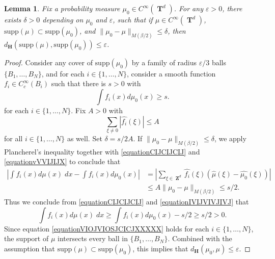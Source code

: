 \documentclass[12pt,reqno]{article}
\numberwithin{equation}{section}
\DeclareMathOperator{\ZZ}{\mathbf{Z}}
\DeclareMathOperator{\TT}{\mathbf{T}}
\newtheorem{lemma}[theorem]{Lemma}
\numberwithin{theorem}{section}
\begin{document}
\begin{lemma} \label{LemmaTAOIAWOIDJ12301}
    Fix a probability measure $\mu_0 \in C^\infty(\TT^d)$. For any $\varepsilon > 0$, there exists $\delta > 0$ depending on $\mu_0$ and $\varepsilon$, such that if $\mu \in C^\infty(\TT^d)$, $\text{supp}(\mu) \subset \text{supp}(\mu_0)$, and $\| \mu_0 - \mu \|_{M(\beta/2)} \leq \delta$, then $d_\mathbf{H}(\text{supp}(\mu),\text{supp}(\mu_0)) \leq \varepsilon$.
\end{lemma}
\begin{proof}
    Consider any cover of $\text{supp}(\mu_0)$ by a family of radius $\varepsilon/3$ balls $\{ B_1,\dots,B_N \}$, and for each $i \in \{ 1, \dots, N \}$, consider a smooth function $f_i \in C_c^\infty(B_i)$ such that there is $s > 0$ with
    \begin{equation} \label{equationCIJCIJCIJ}
        \int f_i(x) d\mu_0(x) \geq s.
    \end{equation}
    for each $i \in \{ 1, \dots, N \}$. Fix $A > 0$ with
    \begin{equation} \label{equationvVVIJIJX}
        \sum_{\xi \neq 0} |\widehat{f_i}(\xi)| \leq A
    \end{equation}
    for all $i \in \{ 1, \dots, N \}$ as well. Set $\delta = s/2A$. If $\| \mu_0 - \mu \|_{M(\beta/2)} \leq \delta$, we apply Plancherel's inequality together with \eqref{equationCIJCIJCIJ} and \eqref{equationvVVIJIJX} to conclude that
    \begin{equation} \label{equationIVIJVIVJIVJ}
    \begin{split}
        \left| \int f_i(x) d\mu(x)\; dx - \int f_i(x) d\mu_0(x) \right| &= \left| \sum_{\xi \in \ZZ^d} \widehat{f_i}(\xi) \left( \widehat{\mu}(\xi) - \widehat{\mu_0}(\xi) \right) \right|\\
        &\leq A \| \mu_0 - \mu \|_{M(\beta/2)} \leq s/2.
    \end{split}
    \end{equation}
    Thus we conclude from \eqref{equationCIJCIJCIJ} and \eqref{equationIVIJVIVJIVJ} that
    \begin{equation} \label{equationVIOJVIOSJCICJXXXXX}
        \int f_i(x) d\mu(x)\; dx \geq \int f_i(x) d\mu_0(x) - s/2 \geq s/2 > 0.
    \end{equation}
    Since equation \eqref{equationVIOJVIOSJCICJXXXXX} holds for each $i \in \{ 1,\dots, N \}$, the support of $\mu$ intersects every ball in $\{ B_1, \dots, B_N \}$. Combined with the assumption that $\text{supp}(\mu) \subset \text{supp}(\mu_0)$, this implies that $d_\mathbf{H}(\mu_0,\mu) \leq \varepsilon$.
\end{proof}
\end{document}

